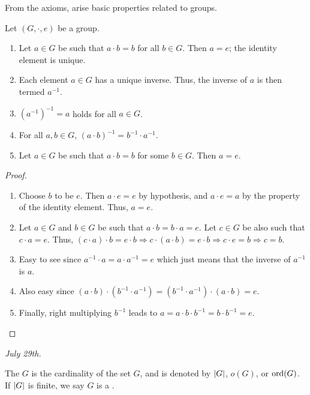 From the axioms, arise basic properties related to groups.
\begin{proposition}
    Let $(G,\cdot,e)$ be a group.
    \begin{enumerate}
        \item Let $a \in G$ be such that $a \cdot b = b$ for all $b \in G$. Then $a = e$; the identity element is unique.
        \item Each element $a \in G$ has a unique inverse. Thus, the inverse of $a$ is then termed $a^{-1}$.
        \item $(a^{-1})^{-1} = a$ holds for all $a \in G$.
        \item For all $a,b \in G$, $(a \cdot b)^{-1} = b^{-1} \cdot a^{-1}$.
        \item  Let $a \in G$ be such that $a \cdot b = b$ for some $b \in G$. Then $a = e$.
    \end{enumerate}
\end{proposition}
\begin{proof}
    \begin{enumerate}
        \item Choose $b$ to be $e$. Then $a \cdot e = e$ by hypothesis, and $a \cdot e = a$ by the property of the identity element. Thus, $a = e$.
        
        \item Let $a \in G$ and $b \in G$ be such that $a \cdot b = b \cdot a = e$. Let $c \in G$ be also such that $c \cdot a = e$. Thus, $(c \cdot a) \cdot b = e \cdot b \Rightarrow c \cdot (a \cdot b) = e \cdot b \Rightarrow c \cdot e = b \Rightarrow c = b$.
        
        \item Easy to see since $a^{-1} \cdot a = a \cdot a^{-1} = e$ which just means that the inverse of $a^{-1}$ is $a$.
        
        \item Also easy since $(a \cdot b) \cdot (b^{-1} \cdot a^{-1}) = (b^{-1} \cdot a^{-1}) \cdot (a \cdot b) = e$.
        
        \item Finally, right multiplying $b^{-1}$ leads to $a = a \cdot b \cdot b^{-1} = b \cdot b^{-1} = e$.
    \end{enumerate}
\end{proof}

\noindent \textit{July 29th.}

\begin{definition}
    The  $G$ is the cardinality of the set $G$, and is denoted by $\left| G \right|$, $o(G)$, or $\operatorname{ord}(G)$. If $\left| G \right|$ is finite, we say $G$ is a .
\end{definition}

